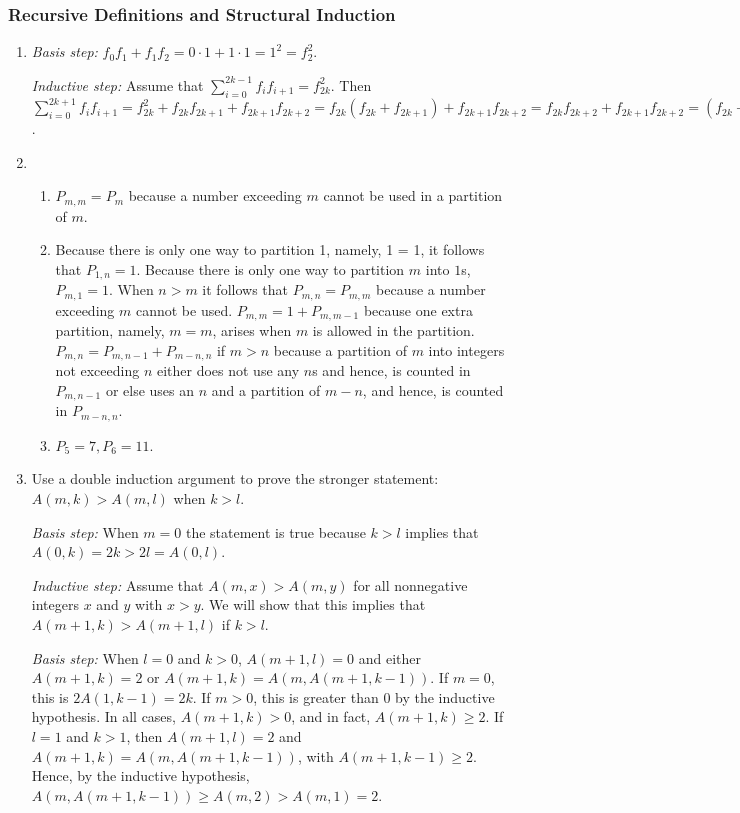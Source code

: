 \documentclass{../../cls/sig-alternate-05-2015}
\begin{document}
\subsubsection{Recursive Definitions and Structural Induction}
\begin{enumerate}
\item \textit{Basis step:} $f_0 f_1 + f_1 f_2 = 0 \cdot 1 + 1 \cdot 1 = 1^2 = f_2^2$.

\textit{Inductive step:} Assume that $\sum_{i = 0}^{2k - 1} f_i f_{i + 1} = f_{2k}^2$.
Then $\sum_{i = 0}^{2k + 1} f_i f_{i + 1} = f_{2k}^2 + f_{2k} f_{2k + 1} + f_{2k + 1} f_{2k + 2} = f_{2k} (f_{2k} + f_{2k + 1}) + f_{2k + 1} f_{2k + 2} = f_{2k} f_{2k + 2} + f_{2k + 1} f_{2k + 2} = (f_{2k} + f_{2k + 1}) f_{2k + 2} = f_{2k + 2}^2$.

\item \begin{enumerate}
	\item $P_{m, m} = P_m$ because a number exceeding $m$ cannot be used in a partition of $m$.
	\item Because there is only one way to partition 1, namely, 1 = 1, it follows that $P_{1,n} = 1$.
	Because there is only one way to partition $m$ into $1$s, $P_{m,1} = 1$. When $n > m$ it follows that $P_{m, n} = P_{m, m}$ because a number exceeding $m$ cannot be used.
	$P_{m, m} = 1 + P_{m, m - 1}$ because one extra partition,
	namely, $m = m$,
	arises when $m$ is allowed in the partition.
	$P_{m, n} = P_{m, n - 1} + P_{m - n, n}$ if $m > n$ because a partition of $m$ into integers not exceeding $n$ either does not use any $n$s and hence,
	is counted in $P_{m, n - 1}$ or else uses an $n$ and a partition of $m - n$, and hence, is counted in $P_{m - n, n}$.
	\item $P_5 = 7, P_6 = 11$.
\end{enumerate}

\item Use a double induction argument to prove the stronger statement:
$A(m, k) > A(m, l)$ when $k > l$.

\textit{Basis step:}
When $m = 0$ the statement is true because $k > l$ implies that $A(0, k) = 2k > 2l = A(0, l)$.

\textit{Inductive step:} Assume that $A(m, x) > A(m, y)$ for all nonnegative integers $x$ and $y$ with $x > y$.
We will show that this implies that $A(m + 1, k) > A(m + 1, l)$ if $k > l$.

\textit{Basis step:} When $l = 0$ and $k > 0$, $A(m + 1, l) = 0$ and either $A(m + 1, k) = 2$ or $A(m + 1, k) = A(m, A(m + 1, k - 1))$.
If $m = 0$, this is $2A(1, k - 1) = 2k$.
If $m > 0$,
this is greater than 0 by the inductive hypothesis.
In all cases, $A(m + 1, k) > 0$,
and in fact, $A(m + 1, k) \ge 2$.
If $l = 1$ and $k > 1$,
then $A(m + 1, l) = 2$ and $A(m + 1, k) = A(m, A(m + 1, k - 1))$,
with $A(m + 1, k - 1) \ge 2$.
Hence, by the inductive hypothesis,
$A(m, A(m + 1, k - 1)) \ge A(m, 2) > A(m, 1) = 2$.


\end{enumerate}
\end{document}
